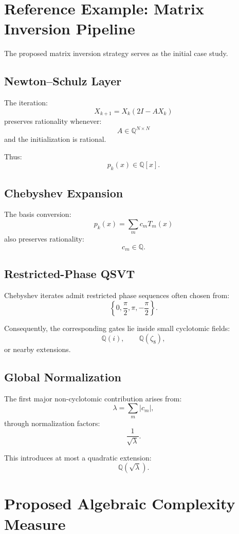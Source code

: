 \documentclass[12pt,a4paper]{article}
\begin{document}
\section{Reference Example: Matrix Inversion Pipeline}

The proposed matrix inversion strategy serves as the initial case study.

\subsection{Newton--Schulz Layer}

The iteration:
\[
X_{k+1}
=
X_k(2I-AX_k)
\]
preserves rationality whenever:
\[
A \in \mathbb Q^{N\times N}
\]
and the initialization is rational.

Thus:
\[
p_k(x)\in\mathbb Q[x].
\]

\subsection{Chebyshev Expansion}

The basis conversion:
\[
p_k(x)
=
\sum_m c_m T_m(x)
\]
also preserves rationality:
\[
c_m\in\mathbb Q.
\]

\subsection{Restricted-Phase QSVT}

Chebyshev iterates admit restricted phase sequences often chosen from:
\[
\left\{
0,\frac{\pi}{2},\pi,-\frac{\pi}{2}
\right\}.
\]

Consequently, the corresponding gates lie inside small cyclotomic fields:
\[
\mathbb Q(i),
\qquad
\mathbb Q(\zeta_8),
\]
or nearby extensions.

\subsection{Global Normalization}

The first major non-cyclotomic contribution arises from:
\[
\lambda
=
\sum_m |c_m|,
\]
through normalization factors:
\[
\frac1{\sqrt{\lambda}}.
\]

This introduces at most a quadratic extension:
\[
\mathbb Q(\sqrt{\lambda}).
\]


\section{Proposed Algebraic Complexity Measure}
\end{document}
